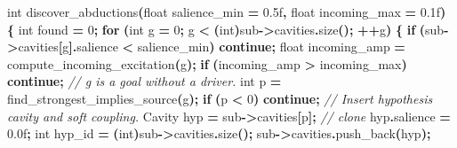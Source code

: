 \documentclass[
  11pt,
  a4paper,
]{article}
\newenvironment{Shaded}{\begin{snugshade}}{\end{snugshade}}
\newcommand{\BuiltInTok}[1]{#1}
\newcommand{\CommentTok}[1]{\textcolor[rgb]{0.56,0.35,0.01}{\textit{#1}}}
\newcommand{\ControlFlowTok}[1]{\textcolor[rgb]{0.13,0.29,0.53}{\textbf{#1}}}
\newcommand{\DataTypeTok}[1]{\textcolor[rgb]{0.13,0.29,0.53}{#1}}
\newcommand{\DecValTok}[1]{\textcolor[rgb]{0.00,0.00,0.81}{#1}}
\newcommand{\FloatTok}[1]{\textcolor[rgb]{0.00,0.00,0.81}{#1}}
\newcommand{\NormalTok}[1]{#1}
\newcommand{\OperatorTok}[1]{\textcolor[rgb]{0.81,0.36,0.00}{\textbf{#1}}}
\begin{document}
\begin{Shaded}
\begin{Highlighting}[]
\DataTypeTok{int}\NormalTok{ discover\_abductions}\OperatorTok{(}\DataTypeTok{float}\NormalTok{ salience\_min }\OperatorTok{=} \FloatTok{0.5}\BuiltInTok{f}\OperatorTok{,}
                        \DataTypeTok{float}\NormalTok{ incoming\_max }\OperatorTok{=} \FloatTok{0.1}\BuiltInTok{f}\OperatorTok{)}
\OperatorTok{\{}
    \DataTypeTok{int}\NormalTok{ found }\OperatorTok{=} \DecValTok{0}\OperatorTok{;}
    \ControlFlowTok{for} \OperatorTok{(}\DataTypeTok{int}\NormalTok{ g }\OperatorTok{=} \DecValTok{0}\OperatorTok{;}\NormalTok{ g }\OperatorTok{\textless{}} \OperatorTok{(}\DataTypeTok{int}\OperatorTok{)}\NormalTok{sub}\OperatorTok{{-}\textgreater{}}\NormalTok{cavities}\OperatorTok{.}\NormalTok{size}\OperatorTok{();} \OperatorTok{++}\NormalTok{g}\OperatorTok{)} \OperatorTok{\{}
        \ControlFlowTok{if} \OperatorTok{(}\NormalTok{sub}\OperatorTok{{-}\textgreater{}}\NormalTok{cavities}\OperatorTok{[}\NormalTok{g}\OperatorTok{].}\NormalTok{salience }\OperatorTok{\textless{}}\NormalTok{ salience\_min}\OperatorTok{)} \ControlFlowTok{continue}\OperatorTok{;}
        \DataTypeTok{float}\NormalTok{ incoming\_amp }\OperatorTok{=}\NormalTok{ compute\_incoming\_excitation}\OperatorTok{(}\NormalTok{g}\OperatorTok{);}
        \ControlFlowTok{if} \OperatorTok{(}\NormalTok{incoming\_amp }\OperatorTok{\textgreater{}}\NormalTok{ incoming\_max}\OperatorTok{)} \ControlFlowTok{continue}\OperatorTok{;}
        \CommentTok{// g is a goal without a driver.}
        \DataTypeTok{int}\NormalTok{ p }\OperatorTok{=}\NormalTok{ find\_strongest\_implies\_source}\OperatorTok{(}\NormalTok{g}\OperatorTok{);}
        \ControlFlowTok{if} \OperatorTok{(}\NormalTok{p }\OperatorTok{\textless{}} \DecValTok{0}\OperatorTok{)} \ControlFlowTok{continue}\OperatorTok{;}
        \CommentTok{// Insert hypothesis cavity and soft coupling.}
\NormalTok{        Cavity hyp }\OperatorTok{=}\NormalTok{ sub}\OperatorTok{{-}\textgreater{}}\NormalTok{cavities}\OperatorTok{[}\NormalTok{p}\OperatorTok{];}  \CommentTok{// clone}
\NormalTok{        hyp}\OperatorTok{.}\NormalTok{salience }\OperatorTok{=} \FloatTok{0.0}\BuiltInTok{f}\OperatorTok{;}
        \DataTypeTok{int}\NormalTok{ hyp\_id }\OperatorTok{=} \OperatorTok{(}\DataTypeTok{int}\OperatorTok{)}\NormalTok{sub}\OperatorTok{{-}\textgreater{}}\NormalTok{cavities}\OperatorTok{.}\NormalTok{size}\OperatorTok{();}
\NormalTok{        sub}\OperatorTok{{-}\textgreater{}}\NormalTok{cavities}\OperatorTok{.}\NormalTok{push\_back}\OperatorTok{(}\NormalTok{hyp}\OperatorTok{);}

\end{Highlighting}
\end{Shaded}
\end{document}

